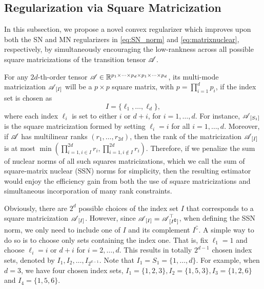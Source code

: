 \documentclass[12pt]{article}
\newcommand{\bm}{\boldsymbol}
\newcommand{\cm}[1]{\mbox{\boldmath$\mathscr{#1}$}}
\begin{document}

\subsection{Regularization via Square Matricization \label{subsec:sqrmode}}
In this subsection, we propose a novel convex regularizer which improves upon both the SN and MN regularizers in \eqref{eq:SN_norm} and \eqref{eq:matrixnuclear}, respectively, by simultaneously encouraging the low-rankness across all possible square matricizations of the transition tensor $\cm{A}$.

For any $2d$-th-order tensor $\cm{A}\in\mathbb{R}^{p_1\times\cdots\times p_{d}\times p_1\times\cdots\times p_{d}}$, its multi-mode matricization $\cm{A}_{[I]}$ will be a $p\times p$ square  matrix, with $p=\prod_{i=1}^{d}p_i$, if the index set is  chosen as \[I=\{\ell_1,\dots, \ell_d\},\] 
where each index $\ell_i$ is set to either $i$ or $d+i$,  for $i=1,\dots, d$.  For instance, $\cm{A}_{[S_1]}$ is the square matricization formed by setting $\ell_i=i$ for all $i=1,\dots, d$.  Moreover, if $\cm{A}$ has multilinear ranks $(r_1,\dots,r_{2d})$, then the rank of the matricization $\cm{A}_{[I]}$ is  at most $\min(\prod_{i=1,i\in I}^{2d}r_i,\prod_{i=1,i\notin I}^{2d}r_i)$. Therefore, if we penalize the sum of nuclear norms of all such squares matricizations, which we call the sum of square-matrix nuclear (SSN) norms for simplicity, then the resulting estimator would  enjoy the efficiency gain from both  the use of square matricizations and simultaneous  incorporation of many rank constraints.


Obviously, there are $2^d$ possible choices of the index set $I$ that corresponds to a square matricization $\cm{A}_{[I]}$. However, since $\cm{A}_{[I]}=\cm{A}_{[I^\complement]}^\top$, when defining the SSN norm, we only need to include one of $I$ and its complement $I^\complement$. A simple way to do so is to choose only sets containing the index one. That is, fix $\ell_1=1$ and choose  $\ell_i=i$ or  $d+i$ for $i=2,\dots, d$. This results in totally $2^{d-1}$ chosen index sets, denoted by $I_1,I_2,\dots,I_{2^{d-1}}$. Note that $I_1=S_1=\{1,\dots, d\}$. For example, when $d=3$, we have four chosen index sets, $I_1=\{1,2,3\}, I_2=\{1,5,3\}, I_3=\{1,2,6\}$ and $I_4=\{1,5,6\}$.
\end{document}
